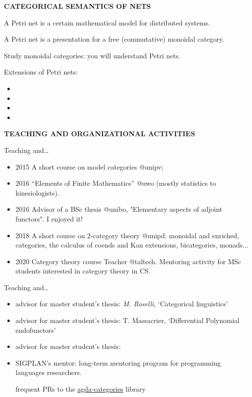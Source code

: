 \documentclass[handout]{beamer}
\begin{document}
\begin{frame}
  \Huge\centering \bfseries CATEGORICAL SEMANTICS OF NETS
\end{frame}
\begin{frame}
A Petri net is a certain mathematical model for distributed systems.

A Petri net is a presentation for a free (commutative) monoidal category.

\begin{center}
  Study monoidal categories: you will understand Petri nets.
\end{center}
\end{frame}
\begin{frame}
Extensions of Petri nets:
\begin{itemize}
  \item
  \item
  \item
  \item
\end{itemize}
\end{frame}
%
%
%
%
%
\begin{frame}
  \Huge\centering \bfseries TEACHING AND ORGANIZATIONAL ACTIVITIES
\end{frame}
%
\begin{frame}{Teaching and\dots}\small
  \begin{itemize}
    \item<+-> 2015 A short course on \alert{model categories} {\color{magenta} @unipv};
    \item<+-> 2016 ``\alert{Elements of Finite Mathematics}'' {\color{magenta} @uwo} (mostly statistics to kinesiologists).
    \item<+-> 2016 \alert{Advisor} of a BSc thesis {\color{magenta} @unibo}, "Elementary aspects of adjoint functors". I enjoyed it!
    \item<+-> 2018 A short course on \alert{2-category theory} {\color{magenta} @unipd}: monoidal and enriched, categories, the calculus of coends and Kan extensions, bicategories, monads...
    \item<+-> 2020 \alert{Category theory} course Teacher {\color{magenta} @taltech}. Mentoring activity for MSc students interested in category theory in CS.
\end{itemize}
\end{frame}
\begin{frame}{Teaching and\dots}\small
  \begin{itemize}
    \item<+-> advisor for master student's thesis: \emph{M. Roselli}, `Categorical linguistics'
    \item<+-> advisor for master student's thesis: T. Massacrier, `Differential Polynomial endofunctors'
    \item<+-> advisor for master student's thesis:
    \item<+-> SIGPLAN's mentor: long-term mentoring program for programming languages researchers.

    {\footnotesize\color{gray!40} frequent PRs to the \href{https://github.com/agda/agda-categories}{agda-categories} library}

\end{itemize}
\end{frame}
\end{document}

